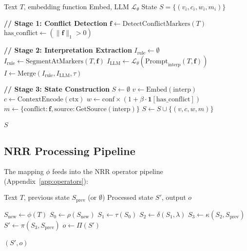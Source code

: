 \documentclass[11pt,a4paper]{article}
\begin{document}
\begin{algorithm}[h]
\caption{Text-to-State Mapping ($\phi$)}
\label{alg:phi}
\begin{algorithmic}[1]
\REQUIRE Text $T$, embedding function Embed, LLM $\mathcal{L}_\theta$
\ENSURE State $S = \{(v_i, c_i, w_i, m_i)\}$

\STATE \textbf{// Stage 1: Conflict Detection}
\STATE $\mathbf{f} \gets \text{DetectConflictMarkers}(T)$
\STATE $\text{has\_conflict} \gets (\|\mathbf{f}\|_1 > 0)$

\STATE \textbf{// Stage 2: Interpretation Extraction}
\STATE $I_{\text{rule}} \gets \emptyset$
    \STATE $I_{\text{rule}} \gets \text{SegmentAtMarkers}(T, \mathbf{f})$
\ENDIF
\STATE $I_{\text{LLM}} \gets \mathcal{L}_\theta(\text{Prompt}_{\text{interp}}(T, \mathbf{f}))$
\STATE $I \gets \text{Merge}(I_{\text{rule}}, I_{\text{LLM}}, \tau)$

\STATE \textbf{// Stage 3: State Construction}
\STATE $S \gets \emptyset$
    \STATE $v \gets \text{Embed}(\text{interp})$
    \STATE $c \gets \text{ContextEncode}(\text{ctx})$
    \STATE $w \gets \text{conf} \times (1 + \beta \cdot \mathbf{1}[\text{has\_conflict}])$
    \STATE $m \gets \{\text{conflict}: \mathbf{f}, \text{source}: \text{GetSource}(\text{interp})\}$
    \STATE $S \gets S \cup \{(v, c, w, m)\}$
\ENDFOR

\RETURN $S$
\end{algorithmic}
\end{algorithm}

\subsection{NRR Processing Pipeline}

The mapping $\phi$ feeds into the NRR operator pipeline (Appendix~\ref{app:operators}):

\begin{algorithm}[h]
\caption{NRR Processing Pipeline}
\label{alg:pipeline}
\begin{algorithmic}[1]
\REQUIRE Text $T$, previous state $S_{\text{prev}}$ (or $\emptyset$)
\ENSURE Processed state $S'$, output $o$

\STATE $S_{\text{new}} \gets \phi(T)$
\STATE $S_0 \gets \rho(S_{\text{new}})$ 
\STATE $S_1 \gets \tau(S_0)$ 
\STATE $S_2 \gets \delta(S_1, \lambda)$ 
\STATE $S_3 \gets \kappa(S_2, S_{\text{prev}})$ 
\STATE $S' \gets \pi(S_3, S_{\text{prev}})$ 
\STATE $o \gets \Pi(S')$ 

\RETURN $(S', o)$
\end{algorithmic}
\end{algorithm}
\end{document}
